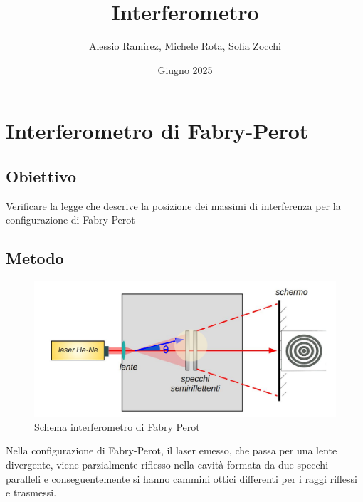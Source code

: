 \documentclass[a4paper]{article}
\title{Interferometro}
\author{Alessio Ramirez, Michele Rota, Sofia Zocchi}
\date{Giugno 2025}
\begin{document}
\maketitle
\tableofcontents
\newpage

\section{Interferometro di Fabry-Perot}
\subsection{Obiettivo}
Verificare la legge che descrive la posizione dei massimi di interferenza per la configurazione di Fabry-Perot

\subsection{Metodo}

\begin{figure}[htbp]
\centering
\includegraphics[width=1.0\textwidth]{./grafici/fabry_perot_immagine}
\caption{Schema interferometro di Fabry Perot}
\label{fig:fabry-perot-schema}
\end{figure}
Nella configurazione di Fabry-Perot, il laser emesso, che passa per una lente divergente, viene parzialmente riflesso nella cavità formata da due specchi paralleli e conseguentemente si hanno cammini ottici differenti per i raggi riflessi e trasmessi. 
\end{document}
